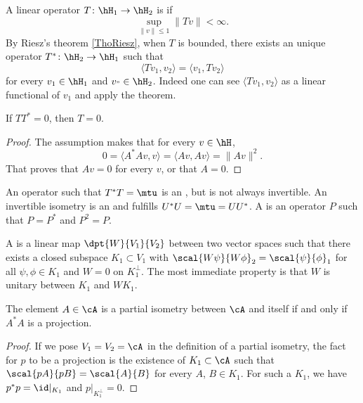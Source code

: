 A linear operator $T\colon \hH_1\to \hH_2$ is  if
\begin{equation}
\sup_{\| v \|\leq 1}\| Tv \|<\infty.
\end{equation}
By Riesz's theorem \ref{ThoRiesz}, when $T$ is bounded, there exists an unique operator $T^*\colon \hH_2\to \hH_1$ such that
\begin{equation}
\langle Tv_1, v_2\rangle =\langle v_1, Tv_2\rangle 
\end{equation}
for every $v_1\in \hH_1$ and $v_"\in\hH_2$. Indeed one can see $\langle Tv_1, v_2\rangle $ as a linear functional of $v_1$ and apply the theorem. 

\begin{lemma}			\label{LemTTzepoT}
If $TT^*=0$, then $T=0$.
\end{lemma}

\begin{proof}
The assumption makes that for every $v\in\hH$, 
\begin{equation}
0=\langle A^*Av, v\rangle =\langle Av, Av\rangle =\| Av \|^2.
\end{equation}
 That proves that $Av=0$ for every $v$, or that $A=0$.
\end{proof}

An operator such that $T^*T=\mtu$ is an , but is not always invertible. An invertible isometry is an  and fulfills $U^*U=\mtu=UU^*$. A  is an operator $P$ such that $P=P^*$ and $P^2=P$.

A  is a linear map $\dpt{ W }{ V_1 }{ V_2 }$ between two vector spaces such that there exists a closed subspace $K_1\subset V_1$ with $\scal{ W\psi }{ W\phi }_2=\scal{ \psi }{ \phi }_1$ for all $\psi,\phi\in K_1$ and $W=0$ on $K_1^{\perp}$. The most immediate property is that $W$ is unitary between $K_1$ and $WK_1$.

\begin{lemma}		\label{LemPartIsomCstar}
The element $A\in\cA$ is a partial isometry between $\cA$ and itself if and only if $A^*A$ is a projection.
\end{lemma}

\begin{proof}
If we pose $V_1=V_2=\cA$ in the definition of a partial isometry, the fact for $p$ to be a projection is the existence of $K_1\subset\cA$ such that $\scal{ pA }{ pB }=\scal{ A }{ B }$ for every $A$, $B\in K_1$. For such a $K_1$, we have $p^*p=\id|_{K_1}$ and $p|_{K_1^{\perp}}=0$.
\end{proof}

